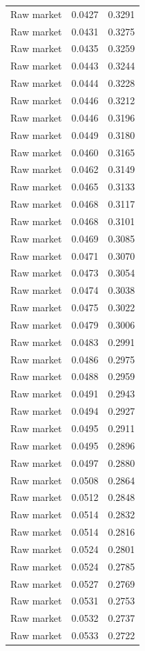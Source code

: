 \begin{table}[htbp]
\begin{tabular}{lll}
Raw market & 0.0427 & 0.3291 \\
Raw market & 0.0431 & 0.3275 \\
Raw market & 0.0435 & 0.3259 \\
Raw market & 0.0443 & 0.3244 \\
Raw market & 0.0444 & 0.3228 \\
Raw market & 0.0446 & 0.3212 \\
Raw market & 0.0446 & 0.3196 \\
Raw market & 0.0449 & 0.3180 \\
Raw market & 0.0460 & 0.3165 \\
Raw market & 0.0462 & 0.3149 \\
Raw market & 0.0465 & 0.3133 \\
Raw market & 0.0468 & 0.3117 \\
Raw market & 0.0468 & 0.3101 \\
Raw market & 0.0469 & 0.3085 \\
Raw market & 0.0471 & 0.3070 \\
Raw market & 0.0473 & 0.3054 \\
Raw market & 0.0474 & 0.3038 \\
Raw market & 0.0475 & 0.3022 \\
Raw market & 0.0479 & 0.3006 \\
Raw market & 0.0483 & 0.2991 \\
Raw market & 0.0486 & 0.2975 \\
Raw market & 0.0488 & 0.2959 \\
Raw market & 0.0491 & 0.2943 \\
Raw market & 0.0494 & 0.2927 \\
Raw market & 0.0495 & 0.2911 \\
Raw market & 0.0495 & 0.2896 \\
Raw market & 0.0497 & 0.2880 \\
Raw market & 0.0508 & 0.2864 \\
Raw market & 0.0512 & 0.2848 \\
Raw market & 0.0514 & 0.2832 \\
Raw market & 0.0514 & 0.2816 \\
Raw market & 0.0524 & 0.2801 \\
Raw market & 0.0524 & 0.2785 \\
Raw market & 0.0527 & 0.2769 \\
Raw market & 0.0531 & 0.2753 \\
Raw market & 0.0532 & 0.2737 \\
Raw market & 0.0533 & 0.2722 \\

\end{tabular}
\end{table}
